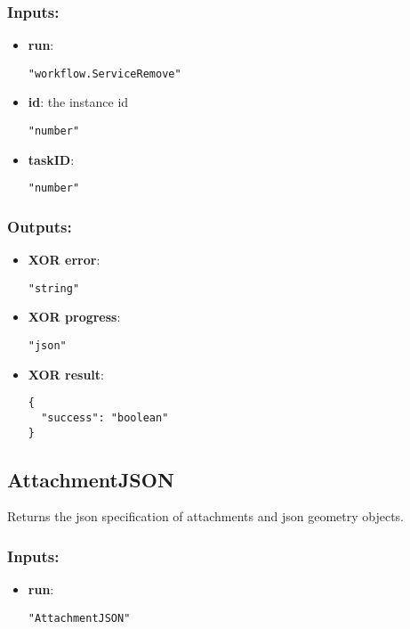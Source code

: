 \subsubsection*{Inputs:}
\begin{itemize}
    \item \textbf{run}: 
\begin{lstlisting}
"workflow.ServiceRemove"
\end{lstlisting}
    \item \textbf{id}: the instance id
\begin{lstlisting}
"number"
\end{lstlisting}
    \item \textbf{taskID}: 
\begin{lstlisting}
"number"
\end{lstlisting}
  \end{itemize}

\subsubsection*{Outputs:}
\begin{itemize}
    \item \textbf{XOR error}: 
\begin{lstlisting}
"string"
\end{lstlisting}
    \item \textbf{XOR progress}: 
\begin{lstlisting}
"json"
\end{lstlisting}
    \item \textbf{XOR result}: 
\begin{lstlisting}
{
  "success": "boolean"
}
\end{lstlisting}
  \end{itemize}

\subsection{AttachmentJSON}
Returns the json specification of attachments and json geometry objects.
\subsubsection*{Inputs:}
\begin{itemize}
    \item \textbf{run}: 
\begin{lstlisting}
"AttachmentJSON"
\end{lstlisting}
  \end{itemize}

